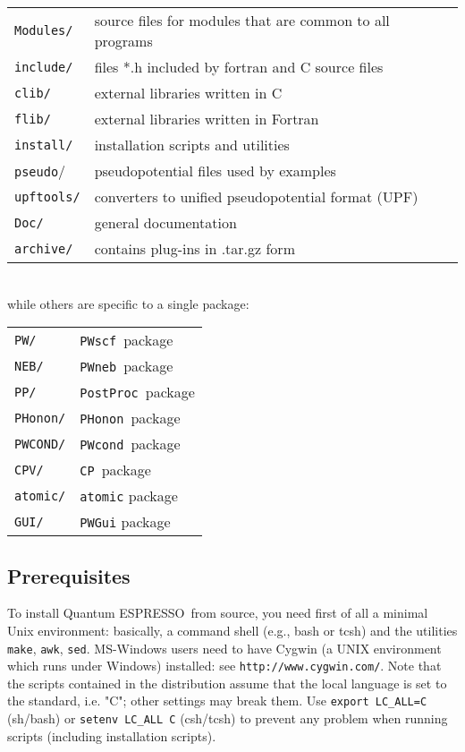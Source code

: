 \documentclass[12pt,a4paper]{article}
\def\qe{{\sc Quantum ESPRESSO}}
\def\PWscf{\texttt{PWscf}}
\def\PHonon{\texttt{PHonon}}
\def\CP{\texttt{CP}}
\def\PostProc{\texttt{PostProc}}
\def\NEB{\texttt{PWneb}} %
\def\make{\texttt{make}}
\begin{document}
\begin{tabular}{ll}
\texttt{Modules/} &  source files for modules that are common to all programs\\
\texttt{include/} &  files *.h included by fortran and C source files\\
\texttt{clib/}    &  external libraries written in C\\
\texttt{flib/}    &  external libraries written in Fortran\\
\texttt{install/} &  installation scripts and utilities\\
\texttt{pseudo}/  &  pseudopotential files used by examples\\
\texttt{upftools/}&  converters to unified pseudopotential format (UPF)\\
\texttt{Doc/}     &  general documentation\\
\texttt{archive/} &  contains plug-ins in .tar.gz form\\
\end{tabular}
\\
while others are specific to a single package:

\begin{tabular}{ll}
\texttt{PW/}      & \PWscf\ package\\
\texttt{NEB/}     & \NEB\ package\\
\texttt{PP/}      & \PostProc\ package\\
\texttt{PHonon/}  & \PHonon\ package\\
\texttt{PWCOND/}  & \texttt{PWcond}\ package\\
\texttt{CPV/}     & \CP\ package\\
\texttt{atomic/}  & \texttt{atomic} package\\
\texttt{GUI/}     & \texttt{PWGui} package\
\end{tabular}

\subsection{Prerequisites}
\label{Sec:Installation}

To install \qe\ from source, you need first of all a minimal Unix 
environment: basically, a command shell (e.g.,
bash or tcsh) and the utilities \make, \texttt{awk}, \texttt{sed}.
 MS-Windows users need to have Cygwin (a UNIX environment which
 runs under Windows) installed:
see \texttt{http://www.cygwin.com/}. Note that the scripts contained 
in the distribution assume that the local  language is set to the 
standard, i.e. "C"; other settings 
may break them. Use \texttt{export LC\_ALL=C} (sh/bash) or
\texttt{setenv LC\_ALL C} (csh/tcsh) to prevent any problem 
when running scripts (including installation scripts).
\end{document}
